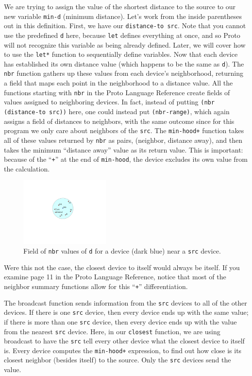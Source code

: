 \documentclass{article}
\newcommand\var[1]{{\tt #1}}
\newcommand\qvar[1]{``{\tt #1}''}
\begin{document}
We are trying to assign the value of the shortest distance to the
source to our new variable \var{min-d} (minimum distance).  Let's work
from the inside parentheses out in this definition.  First, we have
our \var{distance-to src}.  Note that you cannot use the predefined
\var{d} here, because \var{let} defines everything at once, and so
Proto will not recognize this variable as being already defined.
Later, we will cover how to use the \var{let*} function to
sequentially define variables.  Now that each device has established its
own distance value (which happens to be the same as \var{d}).  The
\var{nbr} function gathers up these values from each device's
neighborhood, returning a field that maps each point in the
neighborhood to a distance value.  All the functions starting with
\var{nbr} in the Proto Language Reference create fields of values
assigned to neighboring devices.  In fact, instead of putting
\var{(nbr (distance-to src))} here, one could instead put
\var{(nbr-range)}, which again assigns a field of distances to
neighbors, with the same outcome since for this program we only care
about neighbors of the \var{src}.  The \var{min-hood+} function takes
all of these values returned by \var{nbr} as pairs, (neighbor,
distance away), and then takes the minimum ``distance away'' value as
its return value.  This is important: because of the \qvar{+} at the end
of \var{min-hood}, the device excludes its own value from the calculation.

\begin{figure}[ht]
  \centering
  \includegraphics[width=0.4\textwidth]{figures/nbr-d.pdf}
  \caption{Field of \var{nbr} values of \var{d} for a device (dark
    blue) near a \var{src} device.}
  \label{f:nbrd}
\end{figure}

Were this not the case, the closest device to itself would always be
itself.  If you examine page 11 in the Proto Language Reference,
notice that most of the neighbor summary functions allow for this
\qvar{+} differentiation.  

The broadcast function sends information from the \var{src} devices to
all of the other devices.  If there is one \var{src} device, then
every device ends up with the same value; if there is more than one
\var{src} device, then every device ends up with the value from the
nearest \var{src} device.  Here, in our \var{closest} function, we
are using broadcast to have the \var{src} tell every other device
what the closest device to itself is.  Every device computes the
\var{min-hood+} expression, to find out how close is its closest neighbor 
(besides itself) to the source.  Only the \var{src} devices send the value.
\end{document}
